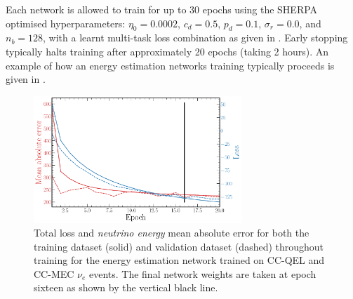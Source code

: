 Each network is allowed to train for up to 30 epochs using the SHERPA optimised hyperparameters:
$\eta_{0}=0.0002$, $c_{d}=0.5$, $p_{d}=0.1$, $\sigma_{r}=0.0$, and $n_{b}=128$, with a learnt
multi-task loss combination as given in . Early stopping typically
halts training after approximately 20 epochs (taking 2 hours). An example of how an energy
estimation networks training typically proceeds is given in .

\begin{figure} %
    \includegraphics[width=0.7\textwidth]{diagrams/7-results/final_energy_history.pdf}
    \caption[Loss and mean absolute error throughout training for the energy estimation network]
    {Total loss and \emph{neutrino energy} mean absolute error for both the training dataset
        (solid) and validation dataset (dashed) throughout training for the energy estimation
        network trained on CC-QEL and CC-MEC $\nu_{e}$ events. The final network weights are taken
        at epoch sixteen as shown by the vertical black line.}
    \label{fig:final_energy_history}
\end{figure}